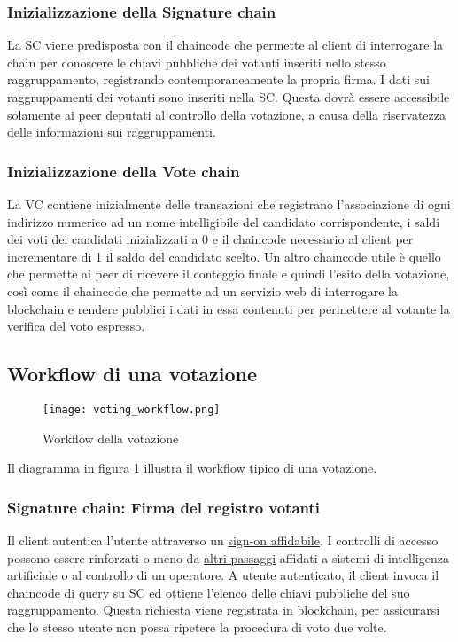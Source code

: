 		\subsubsection{Inizializzazione della Signature chain}
			La SC viene predisposta con il chaincode che permette al client di interrogare la chain per conoscere le chiavi pubbliche dei votanti inseriti nello stesso raggruppamento, registrando contemporaneamente la propria firma. I dati sui raggruppamenti dei votanti sono inseriti nella SC. Questa dovrà essere accessibile solamente ai peer deputati al controllo della votazione, a causa della riservatezza delle informazioni sui raggruppamenti.
		\subsubsection{Inizializzazione della Vote chain}
			La VC contiene inizialmente delle transazioni che registrano l'associazione di ogni indirizzo numerico ad un nome intelligibile del candidato corrispondente, i saldi dei voti dei candidati inizializzati a 0 e il chaincode necessario al client per incrementare di 1 il saldo del candidato scelto. Un altro chaincode utile è quello che permette ai peer di ricevere il conteggio finale e quindi l'esito della votazione, così come il chaincode che permette ad un servizio web di interrogare la blockchain e rendere pubblici i dati in essa contenuti per permettere al votante la verifica del voto espresso.
	
	\subsection{Workflow di una votazione}
		\begin{figure}[ht]
			\centering
			\texttt{[image: voting\_workflow.png]}
			\caption{Workflow della votazione}
			\label{fig:voting_workflow}
		\end{figure}
		Il diagramma in \hyperref[fig:voting_workflow]{figura \ref*{fig:voting_workflow}} illustra il workflow tipico di una votazione.
		\subsubsection{Signature chain: Firma del registro votanti}
			Il client autentica l'utente attraverso un \hyperref[subsec:personalita_voto]{sign-on affidabile}. I controlli di accesso possono essere rinforzati o meno da \hyperref[subsec:liberta_voto]{altri passaggi} affidati a sistemi di intelligenza artificiale o al controllo di un operatore. A utente autenticato, il client invoca il chaincode di query su SC ed ottiene l'elenco delle chiavi pubbliche del suo raggruppamento. Questa richiesta viene registrata in blockchain, per assicurarsi che lo stesso utente non possa ripetere la procedura di voto due volte.
			
